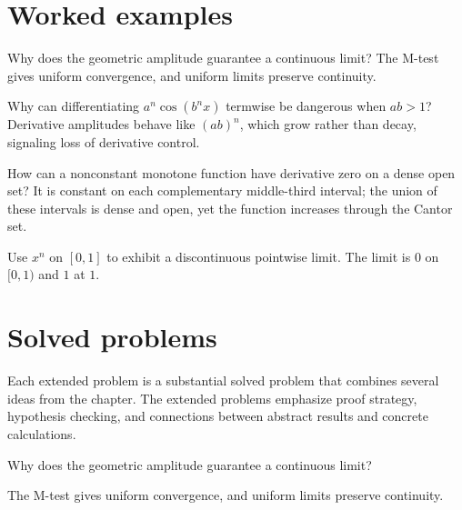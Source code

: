\section{Worked examples}

\begin{example}\label{ex:ii15-worked-01}
Why does the geometric amplitude guarantee a continuous limit? The M-test gives uniform convergence, and uniform limits preserve continuity.
\end{example}

\begin{example}\label{ex:ii15-worked-02}
Why can differentiating $a^n\cos(b^nx)$ termwise be dangerous when $ab>1$? Derivative amplitudes behave like $(ab)^n$, which grow rather than decay, signaling loss of derivative control.
\end{example}

\begin{example}\label{ex:ii15-worked-03}
How can a nonconstant monotone function have derivative zero on a dense open set? It is constant on each complementary middle-third interval; the union of these intervals is dense and open, yet the function increases through the Cantor set.
\end{example}

\begin{example}\label{ex:ii15-worked-04}
Use $x^n$ on $[0,1]$ to exhibit a discontinuous pointwise limit. The limit is $0$ on $[0,1)$ and $1$ at $1$.
\end{example}

\section{Solved problems}
Each extended problem is a substantial solved problem that combines several ideas from the chapter. The extended problems emphasize proof strategy, hypothesis checking, and connections between abstract results and concrete calculations.

\begin{problem}\label{prob:ii15-problem-01}
Why does the geometric amplitude guarantee a continuous limit?
\end{problem}
\begin{solution}
The M-test gives uniform convergence, and uniform limits preserve continuity.
\end{solution}

